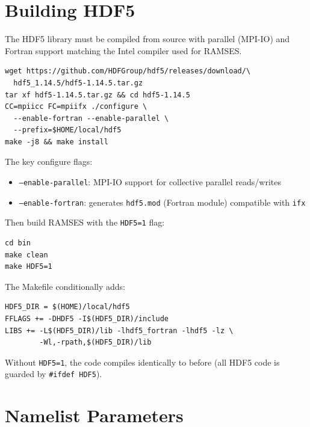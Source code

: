 \documentclass[11pt,fleqn]{book}
\begin{document}
\section{Building HDF5}
\label{sec:hdf5_build}

The HDF5 library must be compiled from source with parallel (MPI-IO) and Fortran support matching the Intel compiler used for RAMSES.

\begin{codebox}
\begin{lstlisting}[style=bash,numbers=none]
wget https://github.com/HDFGroup/hdf5/releases/download/\
  hdf5_1.14.5/hdf5-1.14.5.tar.gz
tar xf hdf5-1.14.5.tar.gz && cd hdf5-1.14.5
CC=mpiicc FC=mpiifx ./configure \
  --enable-fortran --enable-parallel \
  --prefix=$HOME/local/hdf5
make -j8 && make install
\end{lstlisting}
\end{codebox}

The key configure flags:
\begin{itemize}[leftmargin=2em]
  \item \texttt{--enable-parallel}: MPI-IO support for collective parallel reads/writes
  \item \texttt{--enable-fortran}: generates \texttt{hdf5.mod} (Fortran module) compatible with \texttt{ifx}
\end{itemize}

Then build RAMSES with the \texttt{HDF5=1} flag:

\begin{codebox}[Build RAMSES with HDF5]
\begin{lstlisting}[style=bash,numbers=none]
cd bin
make clean
make HDF5=1
\end{lstlisting}
\end{codebox}

The Makefile conditionally adds:
\begin{lstlisting}[style=fortran,numbers=none]
HDF5_DIR = $(HOME)/local/hdf5
FFLAGS += -DHDF5 -I$(HDF5_DIR)/include
LIBS += -L$(HDF5_DIR)/lib -lhdf5_fortran -lhdf5 -lz \
        -Wl,-rpath,$(HDF5_DIR)/lib
\end{lstlisting}

Without \texttt{HDF5=1}, the code compiles identically to before (all HDF5 code is guarded by \texttt{\#ifdef HDF5}).


\section{Namelist Parameters}
\end{document}
